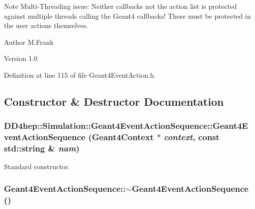 Note Multi-\/Threading issue: Neither callbacks not the action list is protected against multiple threads calling the Geant4 callbacks! These must be protected in the user actions themselves.

\begin{DoxyAuthor}{Author}
M.Frank 
\end{DoxyAuthor}
\begin{DoxyVersion}{Version}
1.0 
\end{DoxyVersion}


Definition at line 115 of file Geant4EventAction.h.

\subsection{Constructor \& Destructor Documentation}
\hypertarget{class_d_d4hep_1_1_simulation_1_1_geant4_event_action_sequence_ad77330c1ed08133eaf312eca7a7ffe79}{
\subsubsection[{Geant4EventActionSequence}]{\setlength{\rightskip}{0pt plus 5cm}DD4hep::Simulation::Geant4EventActionSequence::Geant4EventActionSequence ({\bf Geant4Context} $\ast$ {\em context}, \/  const std::string \& {\em nam})}}
\label{class_d_d4hep_1_1_simulation_1_1_geant4_event_action_sequence_ad77330c1ed08133eaf312eca7a7ffe79}


Standard constructor. \hypertarget{class_d_d4hep_1_1_simulation_1_1_geant4_event_action_sequence_af5bbb63ed3aceb9249cbba78c47fd241}{
\subsubsection[{$\sim$Geant4EventActionSequence}]{\setlength{\rightskip}{0pt plus 5cm}Geant4EventActionSequence::$\sim$Geant4EventActionSequence ()}}
\label{class_d_d4hep_1_1_simulation_1_1_geant4_event_action_sequence_af5bbb63ed3aceb9249cbba78c47fd241}


